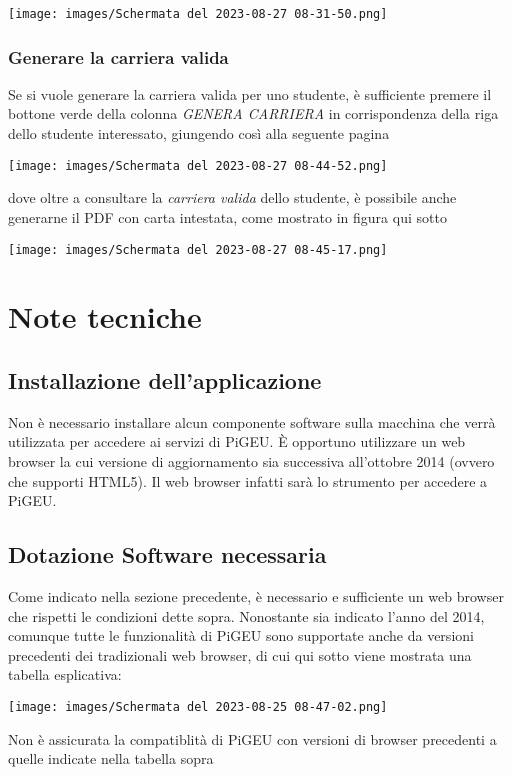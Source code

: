 \documentclass{article}
\begin{document}
    \begin{center}
        \texttt{[image: images/Schermata del 2023-08-27 08-31-50.png]}
    \end{center}

    \pagebreak

    \subsubsection{Generare la carriera valida}
    Se si vuole generare la carriera valida per uno studente, è sufficiente premere il bottone verde della colonna \textit{GENERA CARRIERA} in corrispondenza della riga dello studente interessato, giungendo così alla seguente pagina

    \begin{center}
        \texttt{[image: images/Schermata del 2023-08-27 08-44-52.png]}
    \end{center}

    dove oltre a consultare la \textit{carriera valida} dello studente, è possibile anche generarne il PDF con carta intestata, come mostrato in figura qui sotto

    \begin{center}
        \texttt{[image: images/Schermata del 2023-08-27 08-45-17.png]}
    \end{center}

    \section{Note tecniche}
    \subsection{Installazione dell'applicazione}
    Non è necessario installare alcun componente software sulla macchina che verrà utilizzata per accedere ai servizi di PiGEU. È opportuno utilizzare un web browser la cui versione di aggiornamento sia successiva all'ottobre 2014 (ovvero che supporti HTML5). Il web browser infatti sarà lo strumento per accedere a PiGEU.
    \subsection{Dotazione Software necessaria}
    Come indicato nella sezione precedente, è necessario e sufficiente un web browser che rispetti le condizioni dette sopra. Nonostante sia indicato l'anno del 2014, comunque tutte le funzionalità di PiGEU sono supportate anche da versioni precedenti dei tradizionali web browser, di cui qui sotto viene mostrata una tabella esplicativa:

    \texttt{[image: images/Schermata del 2023-08-25 08-47-02.png]}

    Non è assicurata la compatiblità di PiGEU con versioni di browser precedenti a quelle indicate nella tabella sopra
\end{document}
